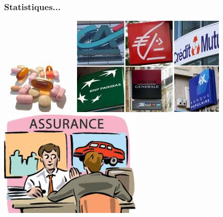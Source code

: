 \documentclass[slideopt,A4]{beamer}
\begin{document}
%
\begin{frame}
\frametitle{Statistiques...}
%
%
\includegraphics[width=0.3\linewidth]{medicaments.jpg}$\;$
\includegraphics[width=0.3\linewidth]{banque}$\;$
\includegraphics[width=0.3\linewidth]{assurance}
%
\end{frame}
%
\end{document}

